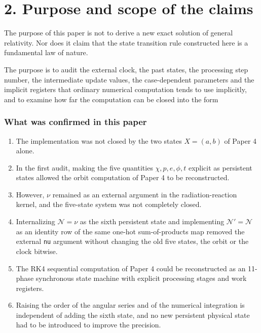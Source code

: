 \documentclass[
  a4paper,
]{article}
\providecommand{\tightlist}{%
  \setlength{\itemsep}{0pt}\setlength{\parskip}{0pt}}
\begin{document}
\begin{center}
\end{center}

\section{2. Purpose and scope of the
claims}\label{purpose-and-scope-of-the-claims}

The purpose of this paper is not to derive a new exact solution of
general relativity. Nor does it claim that the state transition rule
constructed here is a fundamental law of nature.

The purpose is to audit the external clock, the past states, the
processing step number, the intermediate update values, the
case-dependent parameters and the implicit registers that ordinary
numerical computation tends to use implicitly, and to examine how far
the computation can be closed into the form

\begin{center}
\end{center}

\subsubsection{What was confirmed in this
paper}\label{what-was-confirmed-in-this-paper}

\begin{enumerate}
\def\labelenumi{\arabic{enumi}.}
\tightlist
\item
  The implementation was not closed by the two states \(X=(a,b)\) of
  Paper 4 alone.
\item
  In the first audit, making the five quantities \(\chi,p,e,\phi,t\)
  explicit as persistent states allowed the orbit computation of Paper 4
  to be reconstructed.
\item
  However, \(\nu\) remained as an external argument in the
  radiation-reaction kernel, and the five-state system was not
  completely closed.
\item
  Internalizing \(\mathcal N=\nu\) as the sixth persistent state and
  implementing \(\mathcal N'=\mathcal N\) as an identity row of the same
  one-hot sum-of-products map removed the external \texttt{nu} argument
  without changing the old five states, the orbit or the clock bitwise.
\item
  The RK4 sequential computation of Paper 4 could be reconstructed as an
  11-phase synchronous state machine with explicit processing stages and
  work registers.
\item
  Raising the order of the angular series and of the numerical
  integration is independent of adding the sixth state, and no new
  persistent physical state had to be introduced to improve the
  precision.
\end{enumerate}
\end{document}
